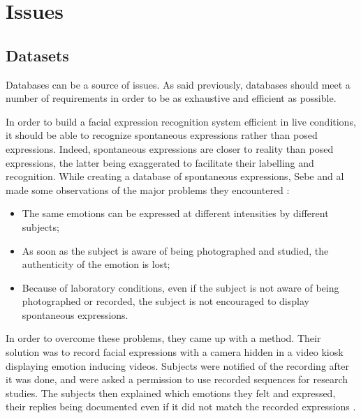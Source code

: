 \section{Issues}

\vspace{\baselineskip}
\subsection{Datasets}

\vspace{\baselineskip}
\noindent Databases can be a source of issues. As said previously, databases should meet a number of requirements in order to be as exhaustive and efficient as possible. 
\newline

\noindent In order to build a facial expression recognition system efficient in live conditions, it should be able to recognize spontaneous expressions rather than posed expressions. Indeed, spontaneous expressions are closer to reality than posed expressions, the latter being exaggerated to facilitate their labelling and recognition. While creating a database of spontaneous expressions, Sebe and al \cite{SEB07} made some observations of the major problems they encountered \cite{BET12}:
\newline
\begin{itemize}
  \item The same emotions can be expressed at different intensities by different subjects;
  \item As soon as the subject is aware of being photographed and studied, the authenticity of the emotion is lost;
  \item Because of laboratory conditions, even if the subject is not aware of being photographed or recorded, the subject is not encouraged to display spontaneous expressions.
\end{itemize}

\vspace{\baselineskip}
\noindent In order to overcome these problems, they came up with a method. Their solution was to record facial expressions with a camera hidden in a video kiosk displaying emotion inducing videos. Subjects were notified of the recording after it was done, and were asked a permission to use recorded sequences for research studies. The subjects then explained which emotions they felt and expressed, their replies being documented even if it did not match the recorded expressions \cite{SEB07}.
\newline

